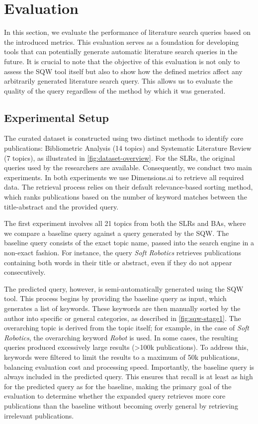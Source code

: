{\let\clearpage\relax \chapter{Evaluation}\label{ch:eval}}
In this section, we evaluate the performance of literature search queries based on the introduced metrics. This evaluation serves as a foundation for developing tools that can potentially generate automatic literature search queries in the future. It is crucial to note that the objective of this evaluation is not only to assess the SQW tool itself but also to show how the defined metrics affect any arbitrarily generated literature search query. This allows us to evaluate the quality of the query regardless of the method by which it was generated.

\vspace*{.5cm}

\section{Experimental Setup}
The curated dataset is constructed using two distinct methods to identify core publications: Bibliometric Analysis (14 topics) and Systematic Literature Review (7 topics), as illustrated in \autoref{fig:dataset-overview}. For the SLRs, the original queries used by the researchers are available. Consequently, we conduct two main experiments. In both experiments we use Dimensions.ai to retrieve all required data. The retrieval process relies on their default relevance-based sorting method, which ranks publications based on the number of keyword matches between the title-abstract and the provided query.

The first experiment involves all 21 topics from both the SLRs and BAs, where we compare a baseline query against a query generated by the SQW. The baseline query consists of the exact topic name, passed into the search engine in a non-exact fashion. For instance, the query \textit{Soft Robotics} retrieves publications containing both words in their title or abstract, even if they do not appear consecutively. 

The predicted query, however, is semi-automatically generated using the SQW tool. This process begins by providing the baseline query as input, which generates a list of keywords. These keywords are then manually sorted by the author into specific or general categories, as described in \autoref{fig:sqw-stage1}. The overarching topic is derived from the topic itself; for example, in the case of \textit{Soft Robotics}, the overarching keyword \textit{Robot} is used. In some cases, the resulting queries produced excessively large results (>100k publications). To address this, keywords were filtered to limit the results to a maximum of 50k publications, balancing evaluation cost and processing speed. Importantly, the baseline query is always included in the predicted query. This ensures that recall is at least as high for the predicted query as for the baseline, making the primary goal of the evaluation to determine whether the expanded query retrieves more core publications than the baseline without becoming overly general by retrieving irrelevant publications.


